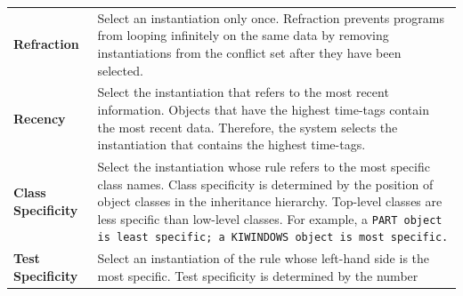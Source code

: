 \begin{table}[h]
  \def\arraystretch{1.2}
  \begin{tabularx}{\columnwidth}{lX}
    \toprule
    \textbf{Refraction}   & Select an instantiation 
                            only once.               
                            Refraction prevents       
                            programs from looping    
                            infinitely on the same   
                            data by removing         
                            instantiations from the 
                            conflict set after they 
                            have been selected.  \\
    \textbf{Recency}      & Select the instantiation 
                            that refers to the most  
                            recent information.      
                            Objects that have the    
                            highest time-tags contain
                            the most recent data.    
                            Therefore, the system    
                            selects the instantiation 
                            that contains the highest
                            time-tags.              \\
    \textbf{Class Specificity} & Select the instantiation 
                                 whose rule refers to the 
                                 most specific class      
                                 names.                   
                                 Class specificity is     
                                 determined by the        
                                 position of object       
                                 classes in the           
                                 inheritance hierarchy.  
                                 Top-level classes are    
                                 less specific than       
                                 low-level classes. For   
                                 example, a \tt{PART} object is 
                                 least specific; a        
                                 \tt{KIWINDOWS} object is most 
                                 specific. \\
    \textbf{Test Specificity} &  Select an instantiation 
                                of the rule whose        
                                left-hand side is the    
                                most specific.          
                                Test specificity is     
                                determined by the number 

\end{tabularx}
\end{table}
